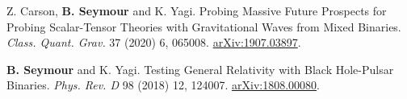\begin{cvpublications}
  \cvpublication
    {Z. Carson, \textbf{B. Seymour} and K. Yagi. Probing Massive Future Prospects for Probing Scalar-Tensor Theories with Gravitational Waves from Mixed Binaries. \textit{Class. Quant. Grav.} 37 (2020) 6, 065008. \href{https://arxiv.org/abs/1907.03897}{arXiv:1907.03897}. } %

  \cvpublication
    {\textbf{B. Seymour} and K. Yagi. Testing General Relativity with Black Hole-Pulsar Binaries. \textit{Phys. Rev. D} 98 (2018) 12, 124007. \href{https://arxiv.org/abs/1808.00080}{arXiv:1808.00080}.} %
    

\end{cvpublications}




    

